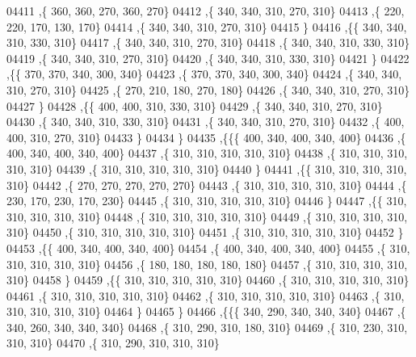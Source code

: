 \begin{DoxyCode}
04411     ,\{   360,   360,   270,   360,   270\}
04412     ,\{   340,   340,   310,   270,   310\}
04413     ,\{   220,   220,   170,   130,   170\}
04414     ,\{   340,   340,   310,   270,   310\}
04415     \}
04416    ,\{\{   340,   340,   310,   330,   310\}
04417     ,\{   340,   340,   310,   270,   310\}
04418     ,\{   340,   340,   310,   330,   310\}
04419     ,\{   340,   340,   310,   270,   310\}
04420     ,\{   340,   340,   310,   330,   310\}
04421     \}
04422    ,\{\{   370,   370,   340,   300,   340\}
04423     ,\{   370,   370,   340,   300,   340\}
04424     ,\{   340,   340,   310,   270,   310\}
04425     ,\{   270,   210,   180,   270,   180\}
04426     ,\{   340,   340,   310,   270,   310\}
04427     \}
04428    ,\{\{   400,   400,   310,   330,   310\}
04429     ,\{   340,   340,   310,   270,   310\}
04430     ,\{   340,   340,   310,   330,   310\}
04431     ,\{   340,   340,   310,   270,   310\}
04432     ,\{   400,   400,   310,   270,   310\}
04433     \}
04434    \}
04435   ,\{\{\{   400,   340,   400,   340,   400\}
04436     ,\{   400,   340,   400,   340,   400\}
04437     ,\{   310,   310,   310,   310,   310\}
04438     ,\{   310,   310,   310,   310,   310\}
04439     ,\{   310,   310,   310,   310,   310\}
04440     \}
04441    ,\{\{   310,   310,   310,   310,   310\}
04442     ,\{   270,   270,   270,   270,   270\}
04443     ,\{   310,   310,   310,   310,   310\}
04444     ,\{   230,   170,   230,   170,   230\}
04445     ,\{   310,   310,   310,   310,   310\}
04446     \}
04447    ,\{\{   310,   310,   310,   310,   310\}
04448     ,\{   310,   310,   310,   310,   310\}
04449     ,\{   310,   310,   310,   310,   310\}
04450     ,\{   310,   310,   310,   310,   310\}
04451     ,\{   310,   310,   310,   310,   310\}
04452     \}
04453    ,\{\{   400,   340,   400,   340,   400\}
04454     ,\{   400,   340,   400,   340,   400\}
04455     ,\{   310,   310,   310,   310,   310\}
04456     ,\{   180,   180,   180,   180,   180\}
04457     ,\{   310,   310,   310,   310,   310\}
04458     \}
04459    ,\{\{   310,   310,   310,   310,   310\}
04460     ,\{   310,   310,   310,   310,   310\}
04461     ,\{   310,   310,   310,   310,   310\}
04462     ,\{   310,   310,   310,   310,   310\}
04463     ,\{   310,   310,   310,   310,   310\}
04464     \}
04465    \}
04466   ,\{\{\{   340,   290,   340,   340,   340\}
04467     ,\{   340,   260,   340,   340,   340\}
04468     ,\{   310,   290,   310,   180,   310\}
04469     ,\{   310,   230,   310,   310,   310\}
04470     ,\{   310,   290,   310,   310,   310\}

\end{DoxyCode}
